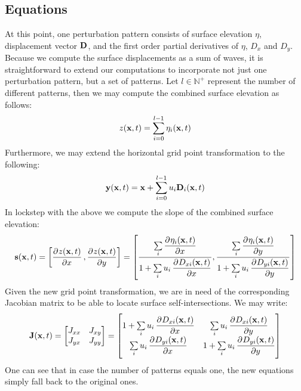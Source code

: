 \subsection{Equations}
At this point, one perturbation pattern consists of surface
elevation $\eta$, displacement vector $\mathbf{D}$, and the first order partial
derivatives of $\eta$, $D_x$ and $D_y$. Because we compute the surface
displacements as a sum of waves, it is straightforward to extend our
computations to incorporate not just one perturbation pattern, but a set of
patterns. Let $l \in \mathbb{N}^+$ represent the number of different patterns,
then we may compute the combined surface elevation as follows:
\begin{equation}
 z(\mathbf{x},t) = \sum\limits_{i=0}^{l-1}\eta_i(\mathbf{x},t)
\end{equation}
Furthermore, we may extend the horizontal grid point transformation to the
following:
\begin{equation}
\mathbf{y}(\mathbf{x},t) = \mathbf{x}+\sum\limits_{i=0}^{l-1}u_i\mathbf{D}_i(\mathbf{x},t) 
\end{equation}
In lockstep with the above we compute the slope of the combined surface elevation:
\begin{equation}
\mvec{s}(\mvec{x},t) = \left[\dpd{z(\mvec{x},t)}{x},\dpd{z(\mvec{x},t)}{y}\right] = \left[\frac{\sum\limits_i \dpd{\eta_i(\mvec{x},t)}{x}}{1 
+ \sum\limits_i u_i \dpd{D_{xi}(\mvec{x},t)}{x}}, \frac{\sum\limits_i 
\dpd{\eta_i(\mvec{x},t)}{y}}{1 + \sum\limits_i 
u_i\dpd{D_{yi}(\mvec{x},t)}{y}}\right]
\end{equation}
Given the new grid point transformation, we are in need of the corresponding
Jacobian matrix to be able to locate surface self-intersections. We may write:
\begin{equation}
 \mvec{J}(\mvec{x},t) =
 \begin{bmatrix}
 J_{xx} & J_{xy} \\
 J_{yx} & J_{yy}
 \end{bmatrix}
 =
 \begin{bmatrix}
   1 + \sum\limits_i u_i\dpd{D_{xi}(\mvec{x},t)}{x} & \sum\limits_i u_i\dpd{D_{xi}(\mvec{x},t)}{y} \\
   \sum\limits_i u_i\dpd{D_{yi}(\mvec{x},t)}{x} & 1 + \sum\limits_i u_i\dpd{D_{yi}(\mvec{x},t)}{y}
 \end{bmatrix}
\end{equation}
%
One can see that in case the number of patterns equals one, the new equations
simply fall back to the original ones.
